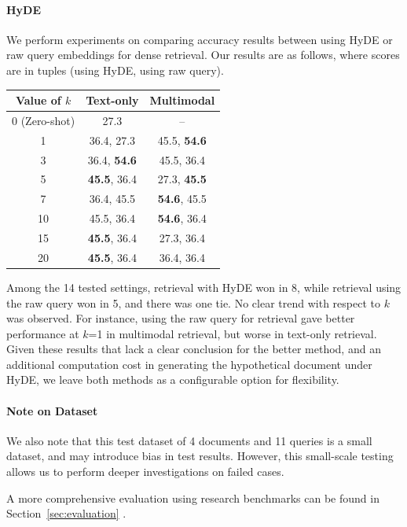 \paragraph{HyDE}
We perform experiments on comparing accuracy results between using HyDE or raw query embeddings for dense retrieval.
Our results are as follows, where scores are in tuples (using HyDE, using raw query).
\begin{center}
    \begin{tabular}{ccc}
        \toprule
        Value of $k$ & Text-only & Multimodal \\
        \midrule
        0 (Zero-shot) & 27.3 & -- \\
        1 & 36.4, 27.3 & 45.5, \textbf{54.6} \\
        3 & 36.4, \textbf{54.6} & 45.5, 36.4 \\
        5 & \textbf{45.5}, 36.4 & 27.3, \textbf{45.5} \\
        7 & 36.4, 45.5 & \textbf{54.6}, 45.5 \\
        10 & 45.5, 36.4 & \textbf{54.6}, 36.4 \\
        15 & \textbf{45.5}, 36.4 & 27.3, 36.4 \\
        20 & \textbf{45.5}, 36.4 & 36.4, 36.4 \\
        \bottomrule
    \end{tabular}
\end{center}

Among the 14 tested settings,
retrieval with HyDE won in 8, while retrieval using the raw query won in 5, and there was one tie.
No clear trend with respect to $k$ was observed.
For instance, using the raw query for retrieval gave better performance at $k$=1 in multimodal retrieval, but worse in text-only retrieval.
Given these results that lack a clear conclusion for the better method, and an additional computation cost in generating the hypothetical document under HyDE,
we leave both methods as a configurable option for flexibility.

\paragraph{Note on Dataset}
We also note that this test dataset of 4 documents and 11 queries is a small dataset, and may introduce bias in test results.
However, this small-scale testing allows us to perform deeper investigations on failed cases.

A more comprehensive evaluation using research benchmarks can be found in Section~\ref{sec:evaluation} .


